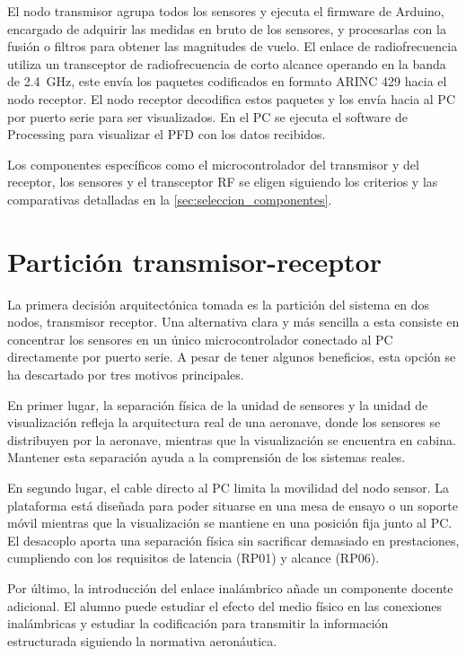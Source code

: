 El nodo transmisor agrupa todos los sensores y ejecuta el firmware de Arduino, encargado de adquirir las medidas en bruto de los sensores, y procesarlas con la fusión o filtros para obtener las magnitudes de vuelo. El enlace de radiofrecuencia utiliza un transceptor de radiofrecuencia de corto alcance operando en la banda de \SI{2.4}{\giga\hertz}, este envía los paquetes codificados en formato ARINC 429 hacia el nodo receptor. El nodo receptor decodifica estos paquetes y los envía hacia al PC por puerto serie para ser visualizados. En el PC se ejecuta el software de Processing para visualizar el PFD con los datos recibidos. 

Los componentes específicos como el microcontrolador del transmisor y del receptor, los sensores y
el transceptor RF se eligen siguiendo los criterios y las comparativas
detalladas en la \cref{sec:seleccion_componentes}.



\section{Partición transmisor-receptor}
\label{sec:particion}

La primera decisión arquitectónica tomada es la partición del sistema en dos nodos, transmisor receptor. Una alternativa clara y más sencilla a esta consiste en concentrar los sensores en un único microcontrolador conectado al PC directamente por puerto serie. A pesar de tener algunos beneficios, esta opción se ha descartado por tres motivos principales.

En primer lugar, la separación física de la unidad de sensores y la unidad de visualización refleja la arquitectura real de una aeronave, donde los sensores se distribuyen por la aeronave, mientras que la visualización se encuentra en cabina. Mantener esta separación ayuda a la comprensión de los sistemas reales.

En segundo lugar, el cable directo al PC limita la movilidad del nodo sensor. La plataforma está diseñada para poder situarse en una mesa de ensayo o un soporte móvil mientras que la visualización se mantiene en una posición fija junto al PC. El desacoplo aporta una separación física sin sacrificar demasiado en prestaciones, cumpliendo con los requisitos de latencia (RP01) y alcance (RP06). 

Por último, la introducción del enlace inalámbrico añade un componente docente adicional. El alumno puede estudiar el efecto del medio físico en las conexiones inalámbricas y estudiar la codificación para transmitir la información estructurada siguiendo la normativa aeronáutica.


